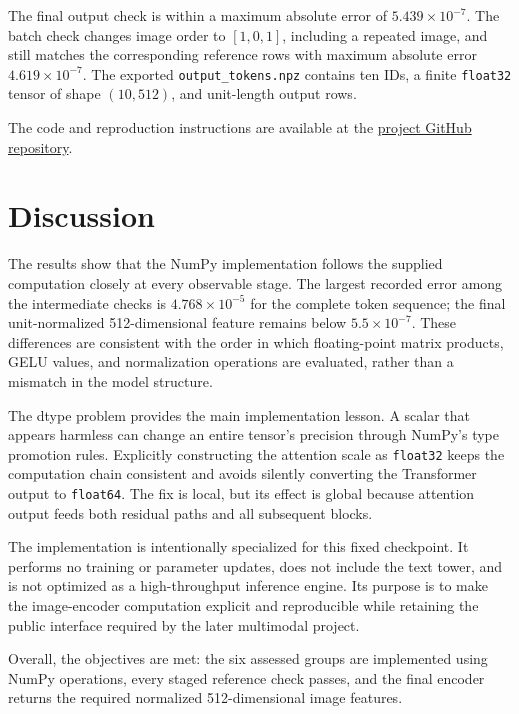 \documentclass[a4paper,12pt]{article}
\begin{document}
The final output check is within a maximum absolute error of
\(5.439\times10^{-7}\). The batch check changes image order to
\([1,0,1]\), including a repeated image, and still matches the corresponding
reference rows with maximum absolute error \(4.619\times10^{-7}\). The exported
\texttt{output\_tokens.npz} contains ten IDs, a finite
\texttt{float32} tensor of shape \((10,512)\), and unit-length output rows.

The code and reproduction instructions are available at the
\href{https://github.com/Luo-start/project1-numpy-student}
{project GitHub repository}.

\section{Discussion}

The results show that the NumPy implementation follows the supplied computation
closely at every observable stage. The largest recorded error among the
intermediate checks is \(4.768\times10^{-5}\) for the complete token sequence;
the final unit-normalized 512-dimensional feature remains below
\(5.5\times10^{-7}\). These differences are consistent with the order in which
floating-point matrix products, GELU values, and normalization operations are
evaluated, rather than a mismatch in the model structure.

The dtype problem provides the main implementation lesson. A scalar that
appears harmless can change an entire tensor's precision through NumPy's type
promotion rules. Explicitly constructing the attention scale as
\texttt{float32} keeps the computation chain consistent and avoids silently
converting the Transformer output to \texttt{float64}. The fix is local, but
its effect is global because attention output feeds both residual paths and all
subsequent blocks.

The implementation is intentionally specialized for this fixed checkpoint.
It performs no training or parameter updates, does not include the text tower,
and is not optimized as a high-throughput inference engine. Its purpose is to
make the image-encoder computation explicit and reproducible while retaining
the public interface required by the later multimodal project.

Overall, the objectives are met: the six assessed groups are implemented using
NumPy operations, every staged reference check passes, and the final encoder
returns the required normalized 512-dimensional image features.

\newpage
\end{document}
